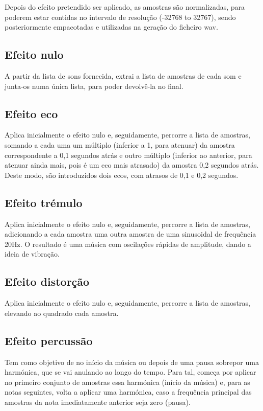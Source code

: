 Depois do efeito pretendido ser aplicado, as amostras são normalizadas, para poderem estar contidas no intervalo de resolução (-32768 to 32767), sendo posteriormente empacotadas e utilizadas na geração do ficheiro wav.

\subsection{Efeito nulo}
A partir da lista de sons fornecida, extrai a lista de amostras de cada som e junta-os numa única lista, para poder devolvê-la no final.

\subsection{Efeito eco}
Aplica inicialmente o efeito nulo e, seguidamente, percorre a lista de amostras, somando a cada uma um múltiplo (inferior a 1, para atenuar) da amostra correspondente a 0,1 segundos atrás e outro múltiplo (inferior ao anterior, para atenuar ainda mais, pois é um eco mais atrasado) da amostra 0,2 segundos atrás. Deste modo, são introduzidos dois ecos, com atrasos de 0,1 e 0,2 segundos.

\subsection{Efeito trémulo}
Aplica inicialmente o efeito nulo e, seguidamente, percorre a lista de amostras, adicionando a cada amostra uma outra amostra de uma sinusoidal de frequência 20Hz. O resultado é uma música com oscilações rápidas de amplitude, dando a ideia de vibração.

\subsection{Efeito distorção}
Aplica inicialmente o efeito nulo e, seguidamente, percorre a lista de amostras, elevando ao quadrado cada amostra.

\subsection{Efeito percussão}
Tem como objetivo de no início da música ou depois de uma pausa sobrepor uma harmónica, que se vai anulando ao longo do tempo. Para tal, começa por aplicar no primeiro conjunto de amostras essa harmónica (início da música) e, para as notas seguintes, volta a aplicar uma harmónica, caso a frequência principal das amostras da nota imediatamente anterior seja zero (pausa).

